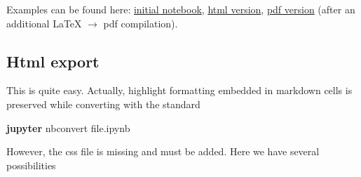 \documentclass{article}
\newenvironment{Shaded}{}{}
\newcommand{\KeywordTok}[1]{\textcolor[rgb]{0.00,0.44,0.13}{\textbf{{#1}}}}
\newcommand{\NormalTok}[1]{{#1}}
\begin{document}
Examples can be found here: \href{tst_highlights.ipynb}{initial
notebook}, \href{tst_highlights.html}{html version},
\href{tst_highlights.pdf}{pdf version} (after an additional LaTeX
\(\rightarrow\) pdf compilation).

    \subsection{Html export}\label{html-export}

This is quite easy. Actually, highlight formatting embedded in markdown
cells is preserved while converting with the standard

\begin{Shaded}
\begin{Highlighting}[]
\KeywordTok{jupyter} \NormalTok{nbconvert file.ipynb}
\end{Highlighting}
\end{Shaded}

However, the css file is missing and must be added. Here we have several
possibilities
\end{document}

